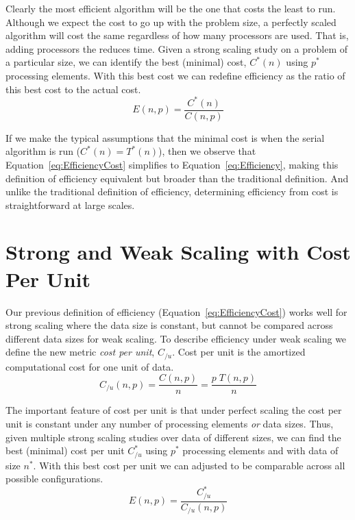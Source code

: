 \documentclass[conference]{IEEEtran}
\newcommand*{\keyterm}[1]{\emph{#1}}
\begin{document}
Clearly the most efficient algorithm will be the one that costs the least
to run. Although we expect the cost to go up with the problem size, a
perfectly scaled algorithm will cost the same regardless of how many
processors are used. That is, adding processors the reduces time. Given a
strong scaling study on a problem of a particular size, we can identify the
best (minimal) cost, $C^*(n)$ using $p^*$ processing elements. With this
best cost we can redefine efficiency as the ratio of this best cost to the
actual cost.
\begin{equation}
  E(n,p) = \frac{C^*(n)}{C(n,p)}
  \label{eq:EfficiencyCost}
\end{equation}

If we make the typical assumptions that the minimal cost is when the serial
algorithm is run ($C^*(n) = T^*(n)$), then we observe that
Equation~\ref{eq:EfficiencyCost} simplifies to
Equation~\ref{eq:Efficiency}, making this definition of efficiency
equivalent but broader than the traditional definition. And unlike the
traditional definition of efficiency, determining efficiency from cost is
straightforward at large scales.


\section{Strong and Weak Scaling with Cost Per Unit}
\label{sec:CostPerUnit}

\noindent
Our previous definition of efficiency (Equation~\ref{eq:EfficiencyCost})
works well for strong scaling where the data size is constant, but cannot
be compared across different data sizes for weak scaling. To describe
efficiency under weak scaling we define the new metric \keyterm{cost per
  unit}, $C_{/u}$. Cost per unit is the amortized computational cost for
one unit of data.
\begin{equation}
  C_{/u}(n,p) = \frac{C(n,p)}{n} = \frac{p \; T(n,p)}{n}
  \label{eq:CostPerUnit}
\end{equation}

The important feature of cost per unit is that under perfect scaling the
cost per unit is constant under any number of processing elements \emph{or}
data sizes. Thus, given multiple strong scaling studies over data of
different sizes, we can find the best (minimal) cost per unit $C_{/u}^*$
using $p^*$ processing elements and with data of size $n^*$. With this best
cost per unit we can adjusted to be comparable across all possible
configurations.
\begin{equation}
  E(n,p) = \frac{C_{/u}^*}{C_{/u}(n,p)}
  \label{eq:EfficiencyCostPerUnit}
\end{equation}
\end{document}
